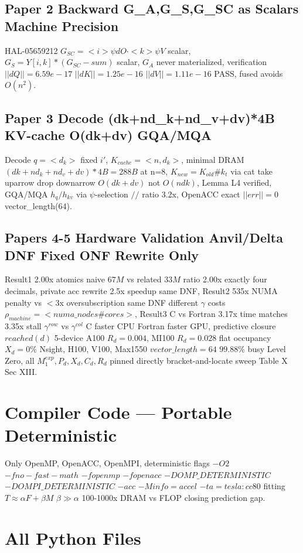 \documentclass[12pt,a4paper]{article}
\begin{document}
\subsection{Paper 2 Backward G\_A,G\_S,G\_SC as Scalars Machine Precision}
HAL-05659212 $G_{SC}=<i>\psi dO\cdot<k>\psi V$ scalar, $G_S=Y[i,k]*(G_{SC}-sum)$ scalar, $G_A$ never materialized, verification $||dQ||=6.59e-17$ $||dK||=1.25e-16$ $||dV||=1.11e-16$ PASS, fused avoids $O(n^2)$.

\subsection{Paper 3 Decode (dk+nd\_k+nd\_v+dv)*4B KV-cache O(dk+dv) GQA/MQA}
Decode $q=<d_k>$ fixed $i'$, $K_{cache}=<n,d_k>$, minimal DRAM $(dk+nd_k+nd_v+dv)*4B=288B$ at n=8, $K_{new}=K_{old}\# k_t$ via cat take uparrow drop downarrow $O(dk+dv)$ not $O(n dk)$, Lemma L4 verified, GQA/MQA $h_q/h_{kv}$ via $\psi$-selection $//$ ratio 3.2x, OpenACC exact $||err||=0$ vector\_length(64).

\subsection{Papers 4-5 Hardware Validation Anvil/Delta DNF Fixed ONF Rewrite Only}
Result1 2.00x atomics naive $67M$ vs related $33M$ ratio 2.00x exactly four decimals, private acc rewrite 2.5x speedup same DNF, Result2 535x NUMA penalty vs $<$3x oversubscription same DNF different $\gamma$ costs $\rho_{machine}=<numa\_nodes\# cores>$, Result3 C vs Fortran 3.17x time matches 3.35x stall $\gamma^{row}$ vs $\gamma^{col}$ C faster CPU Fortran faster GPU, predictive closure $reached(d)$ 5-device A100 $R_d=0.004$, MI100 $R_d=0.028$ flat occupancy $X_d=0\%$ Nsight, H100, V100, Max1550 $vector\_length=64$ $99.88\%$ busy Level Zero, all $M_1^{exp},P_d,X_d,C_d,R_d$ pinned directly bracket-and-locate sweep Table X Sec XIII.

\section{Compiler Code — Portable Deterministic}

Only OpenMP, OpenACC, OpenMPI, deterministic flags $-O2$ $-fno-fast-math$ $-fopenmp$ $-fopenacc$ $-DOMP\_DETERMINISTIC$ $-DOMPI\_DETERMINISTIC$ $-acc$ $-Minfo=accel$ $-ta=tesla:cc80$ fitting $T\approx\alpha F+\beta M$ $\beta\gg\alpha$ 100-1000x DRAM vs FLOP closing prediction gap.

\appendix
\section{All Python Files}
\end{document}
